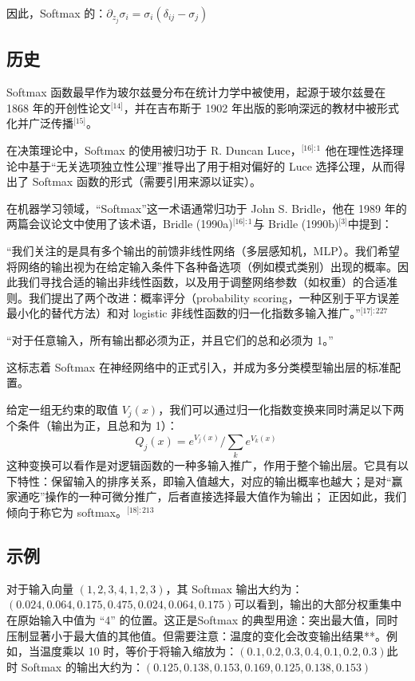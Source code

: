 因此，Softmax 的：$\partial_{z_j} \sigma_i = \sigma_i \left( \delta_{ij} - \sigma_j \right)$
\subsection{历史}
Softmax 函数最早作为玻尔兹曼分布在统计力学中被使用，起源于玻尔兹曼在 1868 年的开创性论文\(^\text{[14]}\)，并在吉布斯于 1902 年出版的影响深远的教材中被形式化并广泛传播\(^\text{[15]}\)。

在决策理论中，Softmax 的使用被归功于 R. Duncan Luce，\(^\text{[16]: 1}\)  他在理性选择理论中基于“无关选项独立性公理”推导出了用于相对偏好的 Luce 选择公理，从而得出了 Softmax 函数的形式（需要引用来源以证实）。

在机器学习领域，“Softmax”这一术语通常归功于 John S. Bridle，他在 1989 年的两篇会议论文中使用了该术语，Bridle (1990a)\(^\text{[16]: 1 }\)与 Bridle (1990b)\(^\text{[3]}\)中提到：

“我们关注的是具有多个输出的前馈非线性网络（多层感知机，MLP）。我们希望将网络的输出视为在给定输入条件下各种备选项（例如模式类别）出现的概率。因此我们寻找合适的输出非线性函数，以及用于调整网络参数（如权重）的合适准则。我们提出了两个改进：概率评分（probability scoring，一种区别于平方误差最小化的替代方法）和对 logistic 非线性函数的归一化指数多输入推广。”\(^\text{[17]: 227 }\)

“对于任意输入，所有输出都必须为正，并且它们的总和必须为 1。”

这标志着 Softmax 在神经网络中的正式引入，并成为多分类模型输出层的标准配置。

给定一组无约束的取值 $V_j(x)$，我们可以通过归一化指数变换来同时满足以下两个条件（输出为正，且总和为 1）：
$$
Q_j(x) = e^{V_j(x)}/\sum_k e^{V_k(x)}~
$$
这种变换可以看作是对逻辑函数的一种多输入推广，作用于整个输出层。它具有以下特性：保留输入的排序关系，即输入值越大，对应的输出概率也越大；是对“赢家通吃”操作的一种可微分推广，后者直接选择最大值作为输出；
正因如此，我们倾向于称它为 softmax。\(^\text{[18]: 213  }\)
\subsection{示例}
对于输入向量 $(1, 2, 3, 4, 1, 2, 3)$，其 Softmax 输出大约为：$(0.024, 0.064, 0.175, 0.475, 0.024, 0.064, 0.175)$可以看到，输出的大部分权重集中在原始输入中值为 “4” 的位置。这正是Softmax 的典型用途：突出最大值，同时压制显著小于最大值的其他值。但需要注意：温度的变化会改变输出结果**。例如，当温度乘以 10 时，等价于将输入缩放为：$(0.1, 0.2, 0.3, 0.4, 0.1, 0.2, 0.3)$此时 Softmax 的输出大约为：$(0.125, 0.138, 0.153, 0.169, 0.125, 0.138, 0.153)$

